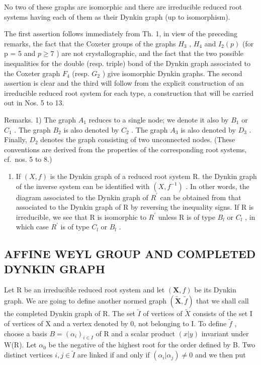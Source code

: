 No two of these graphs are isomorphic and there are irreducible reduced root systems having each of them as their Dynkin graph (up to isomorphism).

The first assertion follows immediately from Th. 1, in view of the preceding remarks, the fact that the Coxeter groups of the graphs \(H_{3}\) , \(H_{4}\) and \(I_{2}(p)\) (for p = 5 and \(p \geqslant 7\) ) are not crystallographic, and the fact that the two possible inequalities for the double (resp. triple) bond of the Dynkin graph associated to the Coxeter graph \(F_{4}\) (resp. \(G_{2}\) ) give isomorphic Dynkin graphs. The second assertion is clear and the third will follow from the explicit construction of an irreducible reduced root system for each type, a construction that will be carried out in Nos. 5 to 13.

Remarks. 1) The graph \(A_{1}\) reduces to a single node; we denote it also by \(B_{1}\) or \(C_{1}\) . The graph \(B_{2}\) is also denoted by \(C_{2}\) . The graph \(A_{3}\) is also denoted by \(D_{3}\) . Finally, \(D_{2}\) denotes the graph consisting of two unconnected nodes. (These conventions are derived from the properties of the corresponding root systems, cf.~nos. 5 to 8.)

\begin{enumerate}
\def\labelenumi{\arabic{enumi})}
\setcounter{enumi}{1}
\tightlist
\item
  If \((X, f)\) is the Dynkin graph of a reduced root system R. the Dynkin graph of the inverse system can be identified with \((X, f^{-1})\) . In other words, the diagram associated to the Dynkin graph of \(R^{\prime}\) can be obtained from that associated to the Dynkin graph of R by reversing the inequality signs. If R is irreducible, we see that R is isomorphic to \(R^{\prime}\) unless R is of type \(B_{l}\) or \(C_{l}\) , in which case \(R^{\prime}\) is of type \(C_{l}\) or \(B_{l}\) .
\end{enumerate}

\subsection{AFFINE WEYL GROUP AND COMPLETED DYNKIN GRAPH}

Let R be an irreducible reduced root system and let \((\mathbf{X}, f)\) be its Dynkin graph. We are going to define another normed graph \((\tilde{\mathbf{X}}, \tilde{f})\) that we shall call the completed Dynkin graph of R. The set \(\tilde{I}\) of vertices of \(\tilde{X}\) consists of the set I of vertices of X and a vertex denoted by 0, not belonging to I. To define \(\tilde{f}\) , choose a basis \(B = (\alpha_{i})_{i \in I}\) of R and a scalar product \((x|y)\) invariant under W(R). Let \(\alpha_{0}\) be the negative of the highest root for the order defined by B. Two distinct vertices \(i, j \in \tilde{I}\) are linked if and only if \((\alpha_{i}|\alpha_{j}) \neq 0\) and we then put


